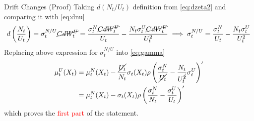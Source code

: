\documentclass{beamer}
\begin{document}
\begin{frame}{Drift Changes (Proof)}   
  Taking $d(N_t/U_t)$ definition from \cref{eq:dzeta2} and comparing it with \cref{eq:dnu}
  \begin{equation}
    d\left(\frac{N_t}{U_t}\right)=\sigma_t^{N/U}\cancel{C dW^U_t} = \frac{\sigma^N_t \cancel{CdW^U_t}}{U_t} - \frac{N_t\sigma^U_t \cancel{C dW^U_t}}{U^2_t}\implies \sigma_t^{N/U}= \frac{\sigma^N_t}{U_t} - \frac{N_t\sigma^U_t}{U^2_t}
  \end{equation}
  Replacing above expression for $\sigma_t^{N/U}$ into \cref{eq:gamma}
  \begin{equation}
    \begin{aligned}
      \mu_t^U(X_t)&=\mu_t^N(X_t)-\frac{\cancel{U_t}}{N_t}\sigma_t(X_t)\rho\left(\frac{\sigma^N_t}{\cancel{U_t}} - \frac{N_t}{U_t^{\cancel{2}}}\sigma^U_t\right)'\\
      &=\mu_t^N(X_t)-\sigma_t(X_t)\rho\left(\frac{\sigma^N_t}{N_t} - \frac{\sigma^U_t}{U_t}\right)'
    \end{aligned}
  \end{equation}
  which proves the \textcolor{red}{first part} of the statement.
\end{frame}
\end{document}
